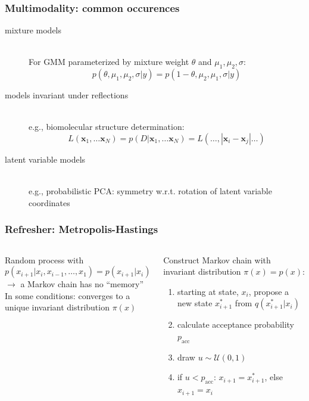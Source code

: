 \documentclass[t,aspectratio=169]{beamer}
\begin{document}
\begin{frame}
  \frametitle{Multimodality: common occurences}
  \begin{description}
  \item[mixture models] \hfill \\
    For GMM parameterized by mixture weight $\theta$ and $\mu_1, \mu_2, \sigma$:
    \begin{equation*}
      p(\theta, \mu_1, \mu_2, \sigma|y) = p(1-\theta, \mu_2, \mu_1, \sigma|y)
    \end{equation*}
  \item[models invariant under reflections] \hfill \\
    e.g., biomolecular structure determination:
    \begin{equation*}
     L(\mathbf x_1, \ldots \mathbf x_N) = p(D|\mathbf x_1, \ldots \mathbf x_N) = L(\ldots, |\mathbf x_i - \mathbf x_j| \ldots)
    \end{equation*}
  \item[latent variable models] \hfill \\
    e.g., probabilistic PCA: symmetry w.r.t. rotation of latent variable coordinates
  \end{description}
\end{frame}

\begin{frame}
  \frametitle{Refresher: Metropolis-Hastings}
  \begin{columns}
  \begin{column}{0.48\textwidth}
  \begin{tcolorbox}[fontupper=\small, title=Markov chain]
    Random process with
    \begin{equation*}
      p(x_{i+1}|x_i, x_{i-1}, \ldots, x_1) = p(x_{i+1}|x_i)
    \end{equation*}
    $\rightarrow$ a Markov chain has no ``memory''\\
    
    In some conditions: converges to a unique invariant distribution $\pi(x)$
  \end{tcolorbox}  
\end{column}
\begin{column}{0.48\textwidth}  
  \begin{tcolorbox}[fontupper=\small, title=Metropolis-Hastings algorithm]
    Construct Markov chain with invariant distribution $\pi(x)=p(x)$:
    \begin{enumerate}
    \item starting at state, $x_i$, propose a new state $x_{i+1}^*$ from $q(x_{i+1}^*|x_i)$
    \item calculate acceptance probability $p_{\mathrm{acc}}$
    \item draw $u \sim \mathcal U(0,1)$
    \item if $u < p_{\mathrm{acc}}$: $x_{i+1} = x_{i+1}^*$, else $x_{i+1} = x_i$
    \end{enumerate}
  \end{tcolorbox}
\end{column}
\end{columns}
\end{frame}
\end{document}
